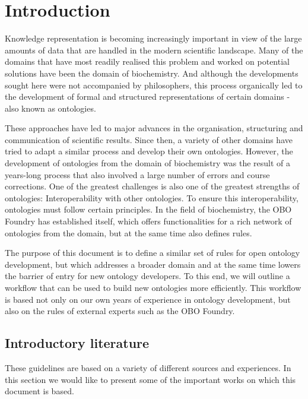 \section{Introduction}


Knowledge representation is becoming increasingly important in view of the large amounts of data that are handled in the modern scientific landscape. Many of the domains that have most readily realised this problem and worked on potential solutions have been the domain of biochemistry. And although the developments sought here were not accompanied by philosophers, this process organically led to the development of formal and structured representations of certain domains - also known as ontologies.

These approaches have led to major advances in the organisation, structuring and communication of scientific results. Since then, a variety of other domains have tried to adapt a similar process and develop their own ontologies. However, the development of ontologies from the domain of biochemistry was the result of a years-long process that also involved a large number of errors and course corrections. One of the greatest challenges is also one of the greatest strengths of ontologies: Interoperability with other ontologies. To ensure this interoperability, ontologies must follow certain principles. In the field of biochemistry, the OBO Foundry has established itself, which offers functionalities for a rich network of ontologies from the domain, but at the same time also defines rules.

The purpose of this document is to define a similar set of rules for open ontology development, but which addresses a broader domain and at the same time lowers the barrier of entry for new ontology developers. To this end, we will outline a workflow that can be used to build new ontologies more efficiently. This workflow is based not only on our own years of experience in ontology development, but also on the rules of external experts such as the OBO Foundry.

\subsection{Introductory literature}


These guidelines are based on a variety of different sources and experiences. In this section we would like to present some of the important works on which this document is based.

